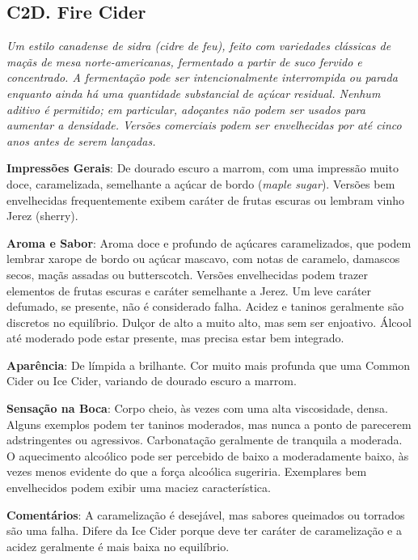 \subsection*{C2D. Fire Cider}

\textit{Um estilo canadense de sidra (cidre de feu), feito com variedades clássicas de maçãs de mesa norte-americanas, fermentado a partir de suco fervido e concentrado. A fermentação pode ser intencionalmente interrompida ou parada enquanto ainda há uma quantidade substancial de açúcar residual. Nenhum aditivo é permitido; em particular, adoçantes não podem ser usados para aumentar a densidade. Versões comerciais podem ser envelhecidas por até cinco anos antes de serem lançadas.}

\textbf{Impressões Gerais}: De dourado escuro a marrom, com uma impressão muito doce, caramelizada, semelhante a açúcar de bordo (\textit{maple sugar}). Versões bem envelhecidas frequentemente exibem caráter de frutas escuras ou lembram vinho Jerez (sherry).

\textbf{Aroma e Sabor}: Aroma doce e profundo de açúcares caramelizados, que podem lembrar xarope de bordo ou açúcar mascavo, com notas de caramelo, damascos secos, maçãs assadas ou butterscotch. Versões envelhecidas podem trazer elementos de frutas escuras e caráter semelhante a Jerez. Um leve caráter defumado, se presente, não é considerado falha. Acidez e taninos geralmente são discretos no equilíbrio. Dulçor de alto a muito alto, mas sem ser enjoativo. Álcool até moderado pode estar presente, mas precisa estar bem integrado. 

\textbf{Aparência}: De límpida a brilhante. Cor muito mais profunda que uma Common Cider ou Ice Cider, variando de dourado escuro a marrom.

\textbf{Sensação na Boca}: Corpo cheio, às vezes com uma alta viscosidade, densa. Alguns exemplos podem ter taninos moderados, mas nunca a ponto de parecerem adstringentes ou agressivos. Carbonatação geralmente de tranquila a moderada. O aquecimento alcoólico pode ser percebido de baixo a moderadamente baixo, às vezes menos evidente do que a força alcoólica sugeriria. Exemplares bem envelhecidos podem exibir uma maciez característica.

\textbf{Comentários}: A caramelização é desejável, mas sabores queimados ou torrados são uma falha. Difere da Ice Cider porque deve ter caráter de caramelização e a acidez geralmente é mais baixa no equilíbrio. 

